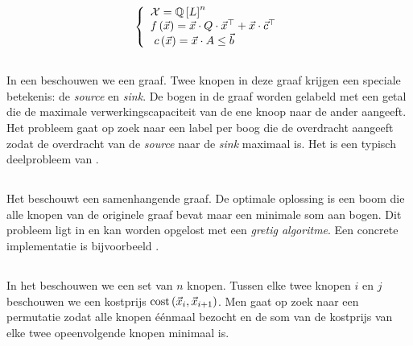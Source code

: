 \begin{equation}
\left\{\begin{array}{ll}
\mathcal{X}=\mathbb{Q}\left[L\right]^n\\
f\left(\vec{x}\right)=\vec{x}\cdot Q\cdot{\vec{x}}^{\top}+\vec{x}\cdot{\vec{c}}^{\top}\\\
c\left(\vec{x}\right)=\vec{x}\cdot A\leq\vec{b}
\end{array}\right.
\end{equation}


\subsection{}

In een  beschouwen we een graaf. Twee knopen in deze graaf krijgen een speciale betekenis: de \emph{source} en \emph{sink}. De bogen in de graaf worden gelabeld met een getal die de maximale verwerkingscapaciteit van de ene knoop naar de ander aangeeft. Het probleem gaat op zoek naar een label per boog die de overdracht aangeeft zodat de overdracht van de \emph{source} naar de \emph{sink} maximaal is. Het  is een typisch deelprobleem van .

\subsection{}

Het  beschouwt een samenhangende graaf. De optimale oplossing is een boom die alle knopen van de originele graaf bevat maar een minimale som aan bogen. Dit probleem ligt in  en kan worden opgelost met een \emph{gretig algoritme}. Een concrete implementatie is bijvoorbeeld \cite{citeulike:4031585}.

\subsection{}

In het  beschouwen we een set van $n$ knopen. Tussen elke twee knopen $i$ en $j$ beschouwen we een kostprijs $\mbox{cost}\left(\vec{x}_i,\vec{x}_{i+1}\right)$. Men gaat op zoek naar een permutatie zodat alle knopen \'e\'enmaal bezocht en de som van de kostprijs van elke twee opeenvolgende knopen minimaal is.


